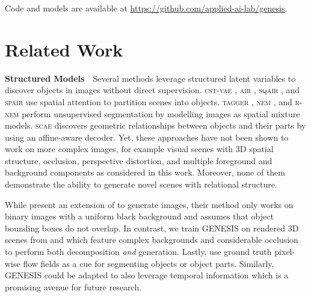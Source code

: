 \documentclass{article}
\begin{document}
Code and models are available at \url{https://github.com/applied-ai-lab/genesis}.
 \section{Related Work}
\label{sec:related}


\textbf{Structured Models}\ \ 
Several methods leverage structured latent variables to discover objects in images without direct supervision.
\textsc{cst-vae} \citep{huang2015efficient}, \textsc{air} \citep{eslami2016attend}, \textsc{sqair} \citep{kosiorek2018sqair}, and \textsc{spair} \citep{crawford2019spatially} use spatial attention to partition scenes into objects.
\textsc{tagger} \citep{greff2016tagger}, \textsc{nem} \citep{greff2017neural}, and \textsc{r-nem} \citep{van2018relational} perform unsupervised segmentation by modelling images as spatial mixture models.
\textsc{scae} \citep{kosiorek2019stacked} discovers geometric relationships between objects and their parts by using an affine-aware decoder.
Yet, these approaches have not been shown to work on more complex images, for example visual scenes with 3D spatial structure, occlusion, perspective distortion, and multiple foreground and background components as considered in this work.
Moreover, none of them demonstrate the ability to generate novel scenes with relational structure.

While \citet{xu2018multi} present an extension of \citet{eslami2016attend} to generate images, their method only works on binary images with a uniform black background and assumes that object bounding boxes do not overlap.
In contrast, we train \gls{GENESIS} on rendered 3D scenes from \citet{eslami2018neural} and \citet{groth2018shapestacks} which feature complex backgrounds and considerable occlusion to perform both decomposition \emph{and} generation.
Lastly, \cite{xu2019unsupervised} use ground truth pixel-wise flow fields as a cue for segmenting objects or object parts.
Similarly, \gls{GENESIS} could be adapted to also leverage temporal information which is a promising avenue for future research.

\clearpage
\end{document}
